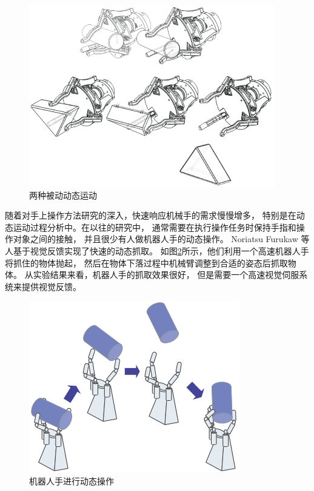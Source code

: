 \begin{figure}[!ht]
  \centering
  \includegraphics[scale=1]{chapter01/pics/1-2.png}
  \caption{两种被动动态运动}
  \label{fig:1-2}
  \vspace{-0.3cm}
\end{figure}

随着对手上操作方法研究的深入，快速响应机械手的需求慢慢增多，
特别是在动态运动过程分析中。在以往的研究中，
通常需要在执行操作任务时保持手指和操作对象之间的接触，
并且很少有人做机器人手的动态操作。
Noriatsu Furukaw 等人基于视觉反馈实现了快速的动态抓取。
如图\ref{fig:1-3}所示，他们利用一个高速机器人手将抓住的物体抛起，
然后在物体下落过程中机械臂调整到合适的姿态后抓取物体。
从实验结果来看，机器人手的抓取效果很好，
但是需要一个高速视觉伺服系统来提供视觉反馈\cite{ref8}。

\begin{figure}[!ht]
  \centering
  \includegraphics[scale=1]{chapter01/pics/1-3.png}
  \caption{机器人手进行动态操作}
  \label{fig:1-3}
  \vspace{-0.3cm}
\end{figure}

